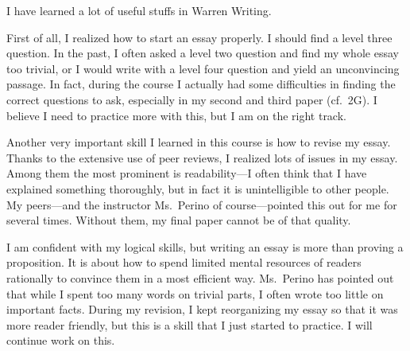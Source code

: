 I have learned a lot of useful stuffs in Warren Writing.

First of all, I realized how to start an essay properly. I should find a
level three question. In the past, I often asked a level two question
and find my whole essay too trivial, or I would write with a level four
question and yield an unconvincing passage. In fact, during the course I
actually had some difficulties in finding the correct questions to ask,
especially in my second and third paper (cf.~2G). I believe I need to
practice more with this, but I am on the right track.

Another very important skill I learned in this course is how to revise
my essay. Thanks to the extensive use of peer reviews, I realized lots
of issues in my essay. Among them the most prominent is readability---I
often think that I have explained something thoroughly, but in fact it
is unintelligible to other people. My peers---and the instructor
Ms.~Perino of course---pointed this out for me for several times.
Without them, my final paper cannot be of that quality.

I am confident with my logical skills, but writing an essay is more than
proving a proposition. It is about how to spend limited mental resources
of readers rationally to convince them in a most efficient way.
Ms.~Perino has pointed out that while I spent too many words on trivial
parts, I often wrote too little on important facts. During my revision,
I kept reorganizing my essay so that it was more reader friendly, but
this is a skill that I just started to practice. I will continue work on
this.
